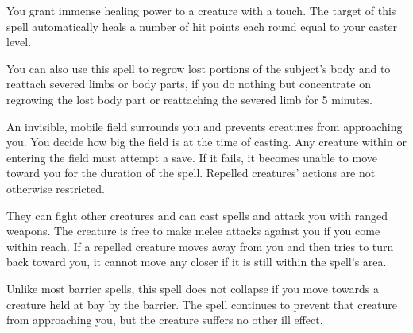 \spelldur{\durshort}
\begin{spelleffect}
  You grant immense healing power to a creature with a touch. The target of this spell automatically heals a number of hit points each round equal to your caster level.
  \par You can also use this spell to regrow lost portions of the subject's body and to reattach severed limbs or body parts, if you do nothing but concentrate on regrowing the lost body part or reattaching the severed limb for 5 minutes.
\end{spelleffect}

\begin{spelleffect}
  An invisible, mobile field surrounds you and prevents creatures from approaching you. You decide how big the field is at the time of casting. Any creature within or entering the field must attempt a save. If it fails, it becomes unable to move toward you for the duration of the spell. Repelled creatures' actions are not otherwise restricted.
  \par They can fight other creatures and can cast spells and attack you with ranged weapons. The creature is free to make melee attacks against you if you come within reach. If a repelled creature moves away from you and then tries to turn back toward you, it cannot move any closer if it is still within the spell's area.
\end{spelleffect}
\begin{spellnotes}
  Unlike most barrier spells, this spell does not collapse if you move towards a creature held at bay by the barrier. The spell continues to prevent that creature from approaching you, but the creature suffers no other ill effect.
\end{spellnotes}

